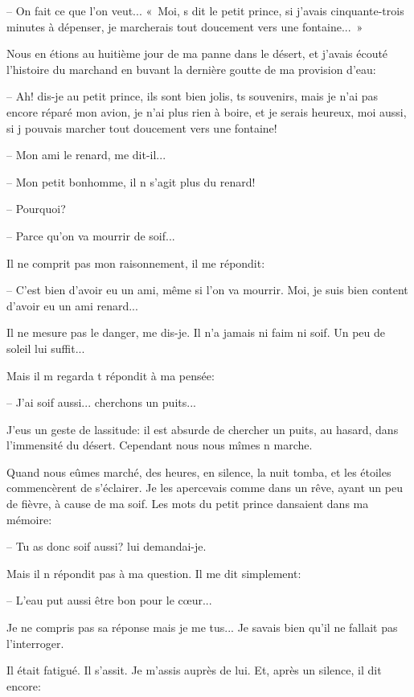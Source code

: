 \documentclass[a4paper]{report}
\begin{document}
-- On fait ce que l'on veut...
«~Moi, s dit le petit prince, si j'avais cinquante-trois minutes à dépenser, je marcherais tout doucement vers une fontaine...~»


\parachapter{} %
Nous en étions au huitième jour de ma panne dans le désert, et j'avais écouté l'histoire du marchand en buvant la dernière goutte de ma provision d'eau:

-- Ah! dis-je au petit prince, ils sont bien jolis, ts souvenirs, mais je n'ai pas encore réparé mon avion, je n'ai plus rien à boire, et je serais heureux, moi aussi, si j pouvais marcher tout doucement vers une fontaine!

-- Mon ami le renard, me dit-il...

-- Mon petit bonhomme, il n s'agit plus du renard!

-- Pourquoi?

-- Parce qu'on va mourrir de soif...

Il ne comprit pas mon raisonnement, il me répondit:

-- C'est bien d'avoir eu un ami, même si l'on va mourrir. Moi, je suis bien content d'avoir eu un ami renard...

Il ne mesure pas le danger, me dis-je. Il n'a jamais ni faim ni soif. Un peu de soleil lui suffit...

Mais il m regarda t répondit à ma pensée:

-- J'ai soif aussi... cherchons un puits...

J'eus un geste de lassitude: il est absurde de chercher un puits, au hasard, dans l'immensité du désert. Cependant nous nous mîmes n marche.

Quand nous eûmes marché, des heures, en silence, la nuit tomba, et les étoiles commencèrent de s'éclairer. Je les apercevais comme dans un rêve, ayant un peu de fièvre, à cause de ma soif. Les mots du petit prince dansaient dans ma mémoire:

-- Tu as donc soif aussi? lui demandai-je.

Mais il n répondit pas à ma question. Il me dit simplement:

-- L'eau put aussi être bon pour le cœur...

Je ne compris pas sa réponse mais je me tus... Je savais bien qu'il ne fallait pas l'interroger.

Il était fatigué. Il s'assit. Je m'assis auprès de lui. Et, après un silence, il dit encore:
\end{document}
